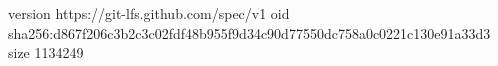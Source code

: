 version https://git-lfs.github.com/spec/v1
oid sha256:d867f206c3b2c3c02fdf48b955f9d34c90d77550dc758a0c0221c130e91a33d3
size 1134249
